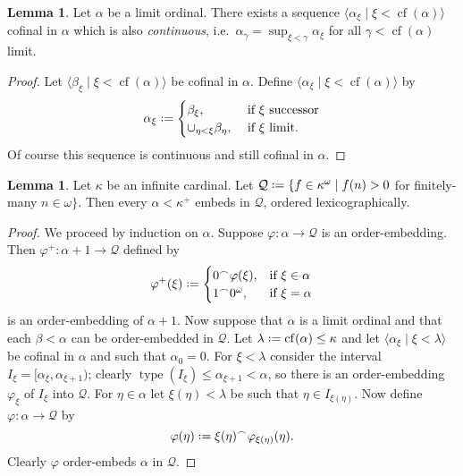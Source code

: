 \documentclass[12pt,a4paper]{report}
\theoremstyle{definition}
\newtheorem{lemma}[theorem]{Lemma}
\theoremstyle{num.custom-title}
\DeclareMathOperator{\type}{type}
\DeclareMathOperator{\cf}{cf}
\newcommand{\Q}{\mathbb{Q}}
\newcommand{\conc}{^\frown}
\newcommand*{\defeq}{\mathrel{\rlap{%
                     \raisebox{0.3ex}{$\cdot$}}%
                     \raisebox{-0.3ex}{$\cdot$}}%
                     =}
\renewcommand{\phi}{\varphi}
\begin{document}
\begin{lemma}\label{lemma-cof_continua}
Let $\alpha$ be a limit ordinal. There exists a sequence $\langle \alpha_\xi \mid \xi < \cf(\alpha) \rangle$ cofinal in $\alpha$ which is also \emph{continuous}, i.e.\ $\alpha_\gamma = \sup_{\xi<\gamma} \alpha_\xi$ for all $\gamma < \cf(\alpha)$ limit.
\begin{proof}
Let $\langle \beta_\xi \mid \xi < \cf(\alpha) \rangle$ be cofinal in $\alpha$. Define $\langle \alpha_\xi \mid \xi < \cf(\alpha) \rangle$ by
\[
\alpha_\xi \defeq
\begin{cases}
\beta_\xi, & \text{ if $\xi$ successor} \\
\cup_{\eta < \xi} \beta_\eta, & \text{ if $\xi$ limit}.
\end{cases}
\]
Of course this sequence is continuous and still cofinal in $\alpha$.
\end{proof}
\end{lemma}

\begin{lemma}\label{lemma-embedding_in_finite_sequences}
\renewcommand{\Q}{\mathcal{Q}}
Let $\kappa$ be an infinite cardinal. Let $\Q \defeq \{f \in \kappa^\omega \mid f(n)>0$ for finitely-many $n \in \omega \}$. Then every $\alpha < \kappa^+$ embeds in $\Q$, ordered lexicographically.
\begin{proof}
We proceed by induction on $\alpha$. Suppose $\phi \colon \alpha \to \Q$ is an order-embedding. Then $\phi^+ \colon \alpha+1 \to \Q$ defined by
\[
\phi^+(\xi) \defeq
\begin{cases}
0 \conc \varphi(\xi), &\text{if } \xi \in \alpha\\
1 \conc 0^\omega, &\text{if }\xi=\alpha
\end{cases}
\]
is an order-embedding of $\alpha+1$. Now suppose that $\alpha$ is a limit ordinal and that each $\beta<\alpha$ can be order-embedded in $\Q$. Let $\lambda \defeq \cf(\alpha) \leq \kappa$ and let $\langle \alpha_\xi \mid \xi < \lambda \rangle$ be cofinal in $\alpha$ and such that $\alpha_0=0$. For $\xi<\lambda$ consider the interval $I_\xi=[\alpha_\xi,\alpha_{\xi+1})$; clearly $\type(I_\xi) \leq \alpha_{\xi+1} < \alpha$, so there is an order-embedding $\phi_\xi$ of $I_\xi$ into $\Q$. For $\eta \in \alpha$ let $\xi(\eta) < \lambda$ be such that $\eta\in I_{\xi(\eta)}$. Now define $\phi \colon \alpha \to \Q$ by
\[
\phi(\eta) \defeq \xi(\eta) \conc \phi_{\xi(\eta)}(\eta).
\]
Clearly $\phi$ order-embeds $\alpha$ in $\Q$.
\end{proof}
\end{lemma}
\end{document}
